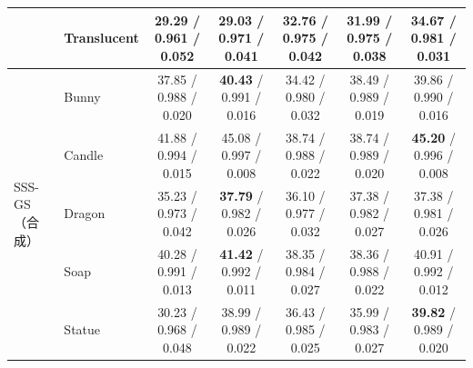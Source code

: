 \begin{table}[t]
\begin{tabular}{@{}llccccc@{}}
 & Translucent & 29.29 / 0.961 / 0.052 & 29.03 / 0.971 / 0.041 & 32.76 / 0.975 / 0.042 & 31.99 / 0.975 / 0.038 & \textbf{34.67} / 0.981 / 0.031 \\
\midrule
\multirow{5}{*}{SSS-GS（合成）} & Bunny & 37.85 / 0.988 / 0.020 & \textbf{40.43} / 0.991 / 0.016 & 34.42 / 0.980 / 0.032 & 38.49 / 0.989 / 0.019 & 39.86 / 0.990 / 0.016 \\
 & Candle & 41.88 / 0.994 / 0.015 & 45.08 / 0.997 / 0.008 & 38.74 / 0.988 / 0.022 & 38.74 / 0.989 / 0.020 & \textbf{45.20} / 0.996 / 0.008 \\
 & Dragon & 35.23 / 0.973 / 0.042 & \textbf{37.79} / 0.982 / 0.026 & 36.10 / 0.977 / 0.032 & 37.38 / 0.982 / 0.027 & 37.38 / 0.981 / 0.026 \\
 & Soap & 40.28 / 0.991 / 0.013 & \textbf{41.42} / 0.992 / 0.011 & 38.35 / 0.984 / 0.027 & 38.36 / 0.988 / 0.022 & 40.91 / 0.992 / 0.012 \\
 & Statue & 30.23 / 0.968 / 0.048 & 38.99 / 0.989 / 0.022 & 36.43 / 0.985 / 0.025 & 35.99 / 0.983 / 0.027 & \textbf{39.82} / 0.989 / 0.020 \\
\bottomrule
\end{tabular}
\end{table}
